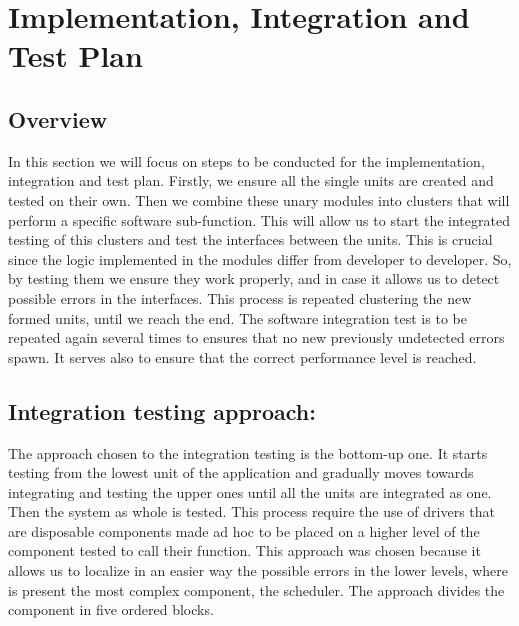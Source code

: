 \chapter{Implementation, Integration and Test Plan}
\section{Overview}
In this section we will focus on steps to be conducted for the implementation, integration and test plan. 
Firstly, we ensure all the single units are created and tested on their own. Then we combine these unary modules into clusters that will perform a specific software sub-function. This will allow us to start the integrated testing of this clusters and test the interfaces between the units. This is crucial since the logic implemented in the modules differ from developer to developer. So, by testing them we ensure they work properly, and in case it allows us to detect possible errors in the interfaces. This process is repeated clustering the new formed units, until we reach the end.
The software integration test is to be repeated again several times to ensures that no new previously undetected errors spawn. It serves also to ensure that the correct performance level is reached.

\section{Integration testing approach:}
The approach chosen to the integration testing is the bottom-up one. It starts testing from the lowest unit of the application and gradually moves towards integrating and testing the upper ones until all the units are integrated as one. Then the system as whole is tested. This process require the use of drivers that are disposable components made ad hoc to be placed on a higher level of the component tested to call their function. 
This approach was chosen because it allows us to localize in an easier way the possible errors in the lower levels, where is present the most complex component, the scheduler. The approach divides the component in five ordered blocks.\\

